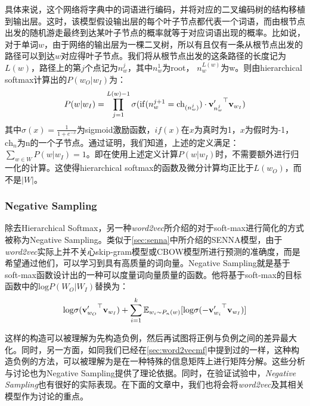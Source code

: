 具体来说，这个网络将字典中的词语进行编码，并将对应的二叉编码树的结构移植到输出层。这时，该模型假设输出层的每个叶子节点都代表一个词语，而由根节点出发的随机游走最终到达某叶子节点的概率就等于对应词语出现的概率。比如说，对于单词$w$，由于网络的输出层为一棵二叉树，所以有且仅有一条从根节点出发的路径可以到达$w$对应得叶子节点。我们将从根节点出发的这条路径的长度记为$L(w)$，路径上的第$j$个点记为$n_w^j$，其中$n_w^1$为root， $n_w^{L(w)}$为w。则由hierarchical softmax计算出的$P(w_O | w_I)$为：
\begin{equation*}
\label{eq:HS}
P(w | w_I) = \prod_{j = 1}^{L(w) - 1} \sigma(\mathrm{if}(n_w^{j+1} = \mathrm{ch}_{(n_w^j)})\cdot {{{\mathbf v}}'_{n_w^j}}^\top {{\mathbf v}}_{w_I})
\end{equation*}
其中$\sigma(x) = \frac{1}{1+e^{-x}}$为sigmoid激励函数，$if(x)$在$x$为真时为1，$x$为假时为-1，$\mathrm{ch}_n$为n的一个子节点。通过证明，我们知道，上述的定义满足：$\sum_{w \in W} P(w | w_I) = 1$。即在使用上述定义计算$P(w | w_I)$时，不需要额外进行归一化的计算。这使得hierarchical softmax的函数及微分计算均正比于$L(w_O)$，而不是$|W|$。

\subsubsection{Negative Sampling}

除去Hierarchical Softmax，另一种\emph{word2vec}所介绍的对于soft-max进行简化的方式被称为Negative Sampling。类似于\ref{sec:senna}中所介绍的SENNA模型，由于\emph{word2vec}实际上并不关心skip-gram模型或CBOW模型所进行预测的准确度，而是希望通过他们，可以学习到具有高质量的词向量。Negative Sampling就是基于soft-max函数设计出的一种可以度量词向量质量的函数。他将基于soft-max的目标函数中的$\mathrm{log}P(W_{O}|W_{I})$替换为：
\begin{equation*}
\label{eq:NS}
\mathrm{log}\sigma({{{\mathbf v}}'_{w_O}}^\top{{\mathbf v}}_{w_I}) + \sum_{i = 1}^k \mathbb{E}_{w_i \sim P_n(w)}[\mathrm{log}\sigma(-{{{\mathbf v}}'_{w_i}}^\top{{\mathbf v}}_{w_I})]
\end{equation*}

这样的构造可以被理解为先构造负例，然后再试图将正例与负例之间的差异最大化。同时，另一方面，如同我们已经在\ref{sec:word2vecmf}中提到过的一样，这种构造负例的方法，可以被理解为是在一种特殊的信息矩阵上进行矩阵分解。这些分析与讨论也为Negative Sampling提供了理论依据。同时，在验证试验中，\emph{Negative Sampling}也有很好的实际表现。在下面的文章中，我们也将会将\emph{word2vec}及其相关模型作为讨论的重点。